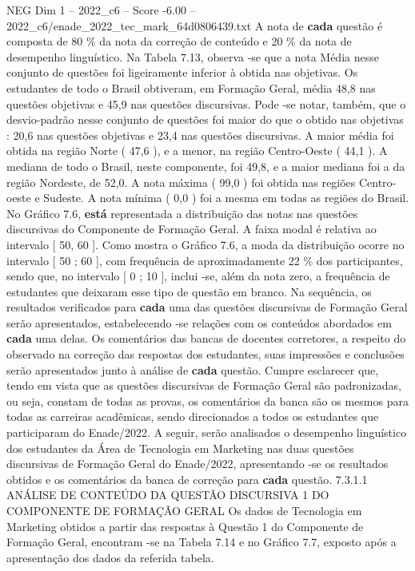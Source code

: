 \begin{textsample}{NEG Dim 1 – 2022\_c6 – Score -6.00 – 2022\_c6/enade\_2022\_tec\_mark\_64d0806439.txt}
A nota de \textbf{cada} questão é composta de 80 \% da nota da correção de conteúdo e 20 \% da nota de desempenho linguístico.
Na Tabela 7.13, observa -se que a nota Média nesse conjunto de questões foi ligeiramente inferior à obtida nas objetivas.
Os estudantes de todo o Brasil obtiveram, em Formação Geral, média 48,8 nas questões objetivas e 45,9 nas questões discursivas.
Pode -se notar, também, que o desvio-padrão nesse conjunto de questões foi maior do que o obtido nas objetivas : 20,6 nas questões objetivas e 23,4 nas questões discursivas.
A maior média foi obtida na região Norte ( 47,6 ), e a menor, na região Centro-Oeste ( 44,1 ).
A mediana de todo o Brasil, neste componente, foi 49,8, e a maior mediana foi a da região Nordeste, de 52,0.
A nota máxima ( 99,0 ) foi obtida nas regiões Centro-oeste e Sudeste.
A nota mínima ( 0,0 ) foi a mesma em todas as regiões do Brasil.
No Gráfico 7.6, \textbf{está} representada a distribuição das notas nas questões discursivas do Componente de Formação Geral.
A faixa modal é relativa ao intervalo [ 50, 60 ].
Como mostra o Gráfico 7.6, a moda da distribuição ocorre no intervalo [ 50 ; 60 ], com frequência de aproximadamente 22 \% dos participantes, sendo que, no intervalo [ 0 ; 10 ], inclui -se, além da nota zero, a frequência de estudantes que deixaram esse tipo de questão em branco.
Na sequência, os resultados verificados para \textbf{cada} uma das questões discursivas de Formação Geral serão apresentados, estabelecendo -se relações com os conteúdos abordados em \textbf{cada} uma delas.
Os comentários das bancas de docentes corretores, a respeito do observado na correção das respostas dos estudantes, suas impressões e conclusões serão apresentados junto à análise de \textbf{cada} questão.
Cumpre esclarecer que, tendo em vista que as questões discursivas de Formação Geral são padronizadas, ou seja, constam de todas as provas, os comentários da banca são os mesmos para todas as carreiras acadêmicas, sendo direcionados a todos os estudantes que participaram do Enade/2022.
A seguir, serão analisados o desempenho linguístico dos estudantes da Área de Tecnologia em Marketing nas duas questões discursivas de Formação Geral do Enade/2022, apresentando -se os resultados obtidos e os comentários da banca de correção para \textbf{cada} questão. 7.3.1.1 ANÁLISE DE CONTEÚDO DA QUESTÃO DISCURSIVA 1 DO COMPONENTE DE FORMAÇÃO GERAL Os dados de Tecnologia em Marketing obtidos a partir das respostas à Questão 1 do Componente de Formação Geral, encontram -se na Tabela 7.14 e no Gráfico 7.7, exposto após a apresentação dos dados da referida tabela.

\end{textsample}
